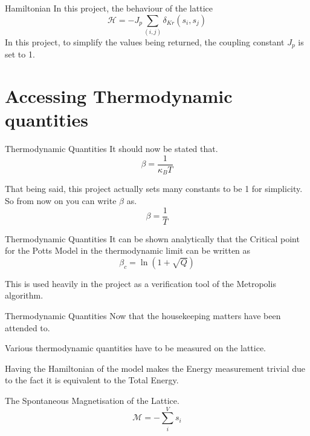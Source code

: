 \documentclass[12pt]{beamer}
\begin{document}
\begin{frame}{Hamiltonian}
In this project, the behaviour of the lattice 
\begin{equation}
\mathcal{H} = -J_{p} \sum_{\left(i,j\right)} \delta_{Kr}\left(s_i,s_j\right)
\end{equation}
In this project, to simplify the values being returned, the coupling constant $J_{p}$ is set to 1.

\end{frame}


\section{Accessing Thermodynamic quantities}
\begin{frame}{Thermodynamic Quantities}
It should now be stated that.
\begin{equation}
\beta = \frac{1}{\kappa_{B} T}
\end{equation}

That being said, this project actually sets many constants to be 1 for simplicity. So from now on you can write $\beta$ as.
\begin{equation}
\beta = \frac{1}{T}
\end{equation}

\end{frame}

\begin{frame}{Thermodynamic Quantities}
It can be shown analytically that the Critical point for the Potts Model in the thermodynamic limit can be written as
\begin{equation}
\beta_{c} = \ln{(1+\sqrt{Q})} 
\end{equation}

This is used heavily in the project as a verification tool of the Metropolis algorithm.

\end{frame}


\begin{frame}{Thermodynamic Quantities}
Now that the housekeeping matters have been attended to.

Various thermodynamic quantities have to be measured on the lattice.

Having the Hamiltonian of the model makes the Energy measurement trivial due to the fact it is equivalent to the Total Energy.

The Spontaneous Magnetisation of the Lattice.
\begin{equation}
\mathcal{M} = -\sum_{i}^{V} s_i
\end{equation}

\end{frame}
\end{document}
